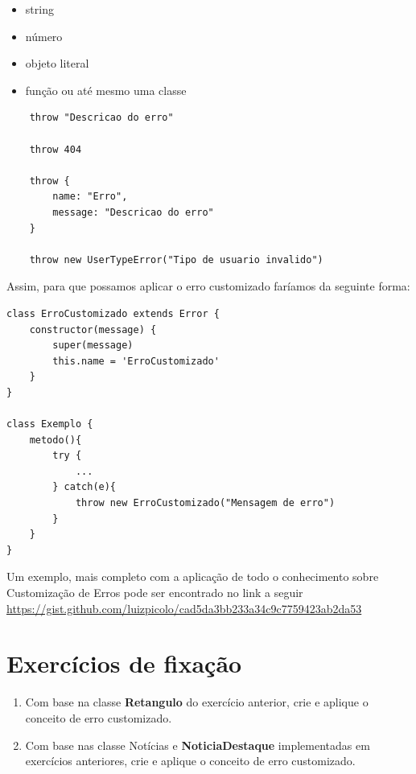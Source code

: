 \begin{itemize}
	\item string
	\item número
	\item objeto literal
	\item função ou até mesmo uma classe
\end{itemize}

\begin{verbatim}
	throw "Descricao do erro"
	
	throw 404
	
	throw {
		name: "Erro",
		message: "Descricao do erro"
	}
	
	throw new UserTypeError("Tipo de usuario invalido")
\end{verbatim}

Assim, para que possamos aplicar o erro customizado faríamos da seguinte forma: 

\begin{verbatim}
class ErroCustomizado extends Error {
	constructor(message) {
		super(message)
		this.name = 'ErroCustomizado'
	}
}

class Exemplo {
	metodo(){
		try {
			...	
		} catch(e){
			throw new ErroCustomizado("Mensagem de erro")	
		}
	}
}
\end{verbatim}

Um exemplo, mais completo com a aplicação de todo o conhecimento sobre Customização de Erros pode ser encontrado no link a seguir \url{https://gist.github.com/luizpicolo/cad5da3bb233a34c9c7759423ab2da53}

\section{Exercícios de fixação}

\begin{enumerate}
	\item Com base na classe \textbf{Retangulo} do exercício anterior, crie e aplique o conceito de erro customizado.
	\item Com base nas classe Notícias e \textbf{NoticiaDestaque} implementadas em exercícios anteriores, crie e aplique o conceito de erro customizado.
\end{enumerate}

